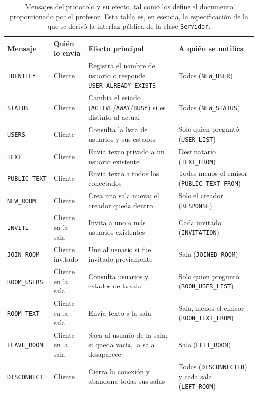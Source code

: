 \documentclass[11pt,letterpaper]{article}
\begin{document}
\begin{longtable}{@{}p{2.1cm}p{3.4cm}p{4.3cm}p{4.3cm}@{}}
\toprule
\textbf{Mensaje} & \textbf{Quién lo envía} & \textbf{Efecto principal} & \textbf{A quién se notifica} \\
\midrule
\endhead
\texttt{IDENTIFY} & Cliente & Registra el nombre de usuario o responde \texttt{USER\_ALREADY\_EXISTS} & Todos (\texttt{NEW\_USER}) \\
\texttt{STATUS} & Cliente & Cambia el estado (\texttt{ACTIVE}/\texttt{AWAY}/\texttt{BUSY}) si es distinto al actual & Todos (\texttt{NEW\_STATUS}) \\
\texttt{USERS} & Cliente & Consulta la lista de usuarios y sus estados & Solo quien preguntó (\texttt{USER\_LIST}) \\
\texttt{TEXT} & Cliente & Envía texto privado a un usuario existente & Destinatario (\texttt{TEXT\_FROM}) \\
\texttt{PUBLIC\_TEXT} & Cliente & Envía texto a todos los conectados & Todos menos el emisor (\texttt{PUBLIC\_TEXT\_FROM}) \\
\texttt{NEW\_ROOM} & Cliente & Crea una sala nueva; el creador queda dentro & Solo el creador (\texttt{RESPONSE}) \\
\texttt{INVITE} & Cliente en la sala & Invita a uno o más usuarios existentes & Cada invitado (\texttt{INVITATION}) \\
\texttt{JOIN\_ROOM} & Cliente invitado & Une al usuario si fue invitado previamente & Sala (\texttt{JOINED\_ROOM}) \\
\texttt{ROOM\_USERS} & Cliente en la sala & Consulta usuarios y estados de la sala & Solo quien preguntó (\texttt{ROOM\_USER\_LIST}) \\
\texttt{ROOM\_TEXT} & Cliente en la sala & Envía texto a la sala & Sala, menos el emisor (\texttt{ROOM\_TEXT\_FROM}) \\
\texttt{LEAVE\_ROOM} & Cliente en la sala & Saca al usuario de la sala; si queda vacía, la sala desaparece & Sala (\texttt{LEFT\_ROOM}) \\
\texttt{DISCONNECT} & Cliente & Cierra la conexión y abandona todas sus salas & Todos (\texttt{DISCONNECTED}) y cada sala (\texttt{LEFT\_ROOM}) \\
\bottomrule
\caption{Mensajes del protocolo y su efecto, tal como los define el documento
proporcionado por el profesor. Esta tabla es, en esencia, la especificación
de la que se derivó la interfaz pública de la clase \texttt{Servidor}.}
\label{tab:protocolo}
\end{longtable}
\end{document}

